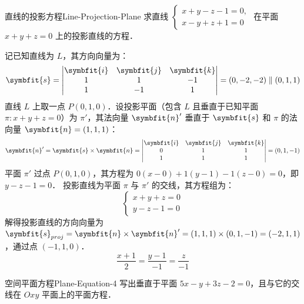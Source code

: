 \begin{problem}{直线的投影方程}{Line-Projection-Plane}
    求直线 $\begin{cases} x + y - z - 1 = 0, \\ x - y + z + 1 = 0 \end{cases}$ 在平面 $x + y + z = 0$ 上的投影直线的方程．
\end{problem}

\begin{solution}
    记已知直线为 $L$，其方向向量为：
    \begin{equation}
        \symbfit{s} = \begin{vmatrix} \symbfit{i} & \symbfit{j} & \symbfit{k} \\ 1 & 1 & -1 \\ 1 & -1 & 1 \end{vmatrix} = (0, -2, -2) \parallel (0, 1, 1)
    \end{equation}
    直线 $L$ 上取一点 $P(0, 1, 0)$．设投影平面（包含 $L$ 且垂直于已知平面 $\pi: x + y + z = 0$）为 $\pi'$，其法向量 $\symbfit{n}'$ 垂直于 $\symbfit{s}$ 和 $\pi$ 的法向量 $\symbfit{n} = (1, 1, 1)$：
    \begin{equation}
        \symbfit{n}' = \symbfit{s} \times \symbfit{n} = \begin{vmatrix} \symbfit{i} & \symbfit{j} & \symbfit{k} \\ 0 & 1 & 1 \\ 1 & 1 & 1 \end{vmatrix} = (0, 1, -1)
    \end{equation}
    平面 $\pi'$ 过点 $P(0, 1, 0)$，其方程为 $0(x - 0) + 1(y - 1) - 1(z - 0) = 0$，即 $y - z - 1 = 0$．
    投影直线为平面 $\pi$ 与 $\pi'$ 的交线，其方程组为：
    \begin{equation}
        \begin{cases} x + y + z = 0 \\ y - z - 1 = 0 \end{cases}
    \end{equation}
    解得投影直线的方向向量为 $\symbfit{s}_{proj} = \symbfit{n} \times \symbfit{n}' = (1, 1, 1) \times (0, 1, -1) = (-2, 1, 1)$，通过点 $(-1, 1, 0)$．
    \begin{equation}
        \boxed{\frac{x + 1}{2} = \frac{y - 1}{-1} = \frac{z}{-1}}
    \end{equation}
\end{solution}


\begin{problem}{空间平面方程}{Plane-Equation-4}
    写出垂直于平面 $5x - y + 3z - 2 = 0$，且与它的交线在 $Oxy$ 平面上的平面方程．
\end{problem}

